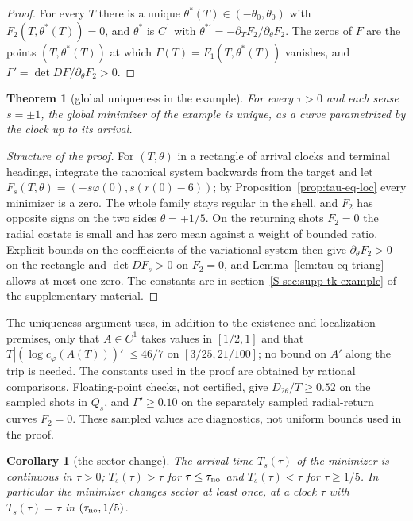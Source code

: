 \documentclass[aip,jmp,amsmath,amssymb,reprint]{revtex4-2}
\theoremstyle{plain}
\newtheorem{theorem}{Theorem}
\newtheorem{corollary}[proposition]{Corollary}
\theoremstyle{definition}
\begin{document}
\begin{proof}
For every $T$ there is a unique $\theta^*(T)\in(-\theta_0,\theta_0)$ with $F_2(T,\theta^*(T))=0$, and $\theta^*$ is
$C^1$ with $\theta^{*\prime}=-\partial_TF_2/\partial_\theta F_2$. The zeros of $F$ are the points $(T,\theta^*(T))$ at which
$\Gamma(T)=F_1(T,\theta^*(T))$ vanishes, and $\Gamma'=\det DF/\partial_\theta F_2>0$.
\end{proof}

\begin{theorem}[global uniqueness in the example]\label{thm:tau-eq-unique}
For every $\tau>0$ and each sense $s=\pm1$, the global minimizer of the example is unique, as a
curve parametrized by the clock up to its arrival.
\end{theorem}

\begin{proof}[Structure of the proof]
For $(T,\theta)$ in a rectangle of arrival clocks and terminal headings, integrate the canonical system
backwards from the target and let $F_s(T,\theta)=(-s\varphi(0),s(r(0)-6))$; by Proposition~\ref{prop:tau-eq-loc}
every minimizer is a zero. The whole family stays regular in the shell, and $F_2$ has opposite signs on the two
sides $\theta=\mp1/5$. On the returning shots $F_2=0$ the radial costate is small and has zero mean
against a weight of bounded ratio. Explicit bounds on the coefficients of the variational system then give
$\partial_\theta F_2>0$ on the rectangle and $\det DF_s>0$ on $F_2=0$, and Lemma~\ref{lem:tau-eq-triang} allows at most one zero. The constants are in
section~\ref{S-sec:supp-tk-example} of the supplementary material.
\end{proof}

The uniqueness argument uses, in addition to the existence and localization premises,
only that $A\in C^1$ takes values in $[1/2,1]$ and that
$T|({\log c_\varphi(A(T))})'|\le46/7$ on $[3/25,21/100]$;
no bound on $A'$ along the trip is needed. The constants used in the proof are
obtained by rational comparisons. Floating-point checks, not certified, give
$D_{2\theta}/T\ge0.52$ on the sampled shots in $Q_s$, and
$\Gamma'\ge0.10$ on the separately sampled radial-return curves $F_2=0$.
These sampled values are diagnostics, not uniform bounds used in the proof.

\begin{corollary}[the sector change]\label{cor:tau-eq-sector}
The arrival time $T_s(\tau)$ of the minimizer is continuous in $\tau>0$; $T_s(\tau)>\tau$ for
$\tau\le\tau_{\rm no}$ and $T_s(\tau)<\tau$ for $\tau\ge1/5$. In particular the minimizer changes sector at
least once, at a clock $\tau$ with $T_s(\tau)=\tau$ in $(\tau_{\rm no},1/5)$.
\end{corollary}
\end{document}
